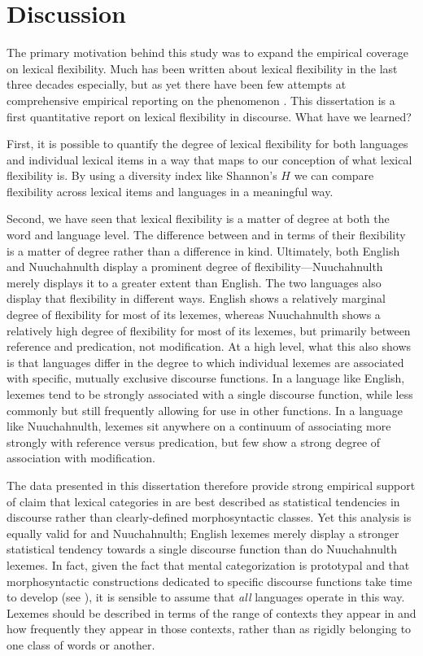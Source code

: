 \section{Discussion}
\label{sec:5.3}

The primary motivation behind this study was to expand the empirical coverage on lexical flexibility. Much has been written about lexical flexibility in the last three decades especially, but as yet there have been few attempts at comprehensive empirical reporting on the phenomenon . This dissertation is a first quantitative report on lexical flexibility in discourse. What have we learned?

First, it is possible to quantify the degree of lexical flexibility for both languages and individual lexical items in a way that maps to our conception of what lexical flexibility is. By using a diversity index like Shannon's $H$ we can compare flexibility across lexical items and languages in a meaningful way.

Second, we have seen that lexical flexibility is a matter of degree at both the word and language level. The difference between  and  in terms of their flexibility is a matter of degree rather than a difference in kind. Ultimately, both English and Nuuchahnulth display a prominent degree of flexibility—Nuuchahnulth merely displays it to a greater extent than English. The two languages also display that flexibility in different ways. English shows a relatively marginal degree of flexibility for most of its lexemes, whereas Nuuchahnulth shows a relatively high degree of flexibility for most of its lexemes, but primarily between reference and predication, not modification. At a high level, what this also shows is that languages differ in the degree to which individual lexemes are associated with specific, mutually exclusive discourse functions. In a language like English, lexemes tend to be strongly associated with a single discourse function, while less commonly but still frequently allowing for use in other functions. In a language like Nuuchahnulth, lexemes sit anywhere on a continuum of associating more strongly with reference versus predication, but few show a strong degree of association with modification.

The data presented in this dissertation therefore provide strong empirical support of  claim that lexical categories in  are best described as statistical tendencies in discourse rather than clearly-defined morphosyntactic classes. Yet this analysis is equally valid for  and Nuuchahnulth; English lexemes merely display a stronger statistical tendency towards a single discourse function than do Nuuchahnulth lexemes. In fact, given the fact that mental categorization is prototypal and that morphosyntactic constructions dedicated to specific discourse functions take time to develop (see ), it is sensible to assume that \emph{all} languages operate in this way. Lexemes should be described in terms of the range of contexts they appear in and how frequently they appear in those contexts, rather than as rigidly belonging to one class of words or another.

